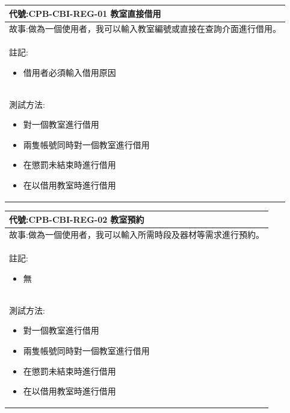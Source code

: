 \documentclass{article}
\begin{document}
\begin{table}[H]
    \begin{tabular}{| m{13cm} |}
		\hline
	代號:CPB-CBI-REG-01	教室直接借用	\\ \hline
	故事:做為一個使用者，我可以輸入教室編號或直接在查詢介面進行借用。		\\	\hline
	註記:
	\begin{itemize}
		\item 借用者必須輸入借用原因
	\end{itemize}		\\ \hline
	測試方法:	
	\begin{itemize}
		\item 對一個教室進行借用
		\item 兩隻帳號同時對一個教室進行借用
		\item 在懲罰未結束時進行借用
		\item 在以借用教室時進行借用
	\end{itemize}
	\\	\hline
    \end{tabular}
\end{table}

\begin{table}[H]
    \begin{tabular}{| m{13cm} |}
		\hline
	代號:CPB-CBI-REG-02	教室預約	\\ \hline
	故事:做為一個使用者，我可以輸入所需時段及器材等需求進行預約。		\\	\hline
	註記:
	\begin{itemize}
		\item 無
	\end{itemize}		\\ \hline
	測試方法:	
	\begin{itemize}
		\item 對一個教室進行借用
		\item 兩隻帳號同時對一個教室進行借用
		\item 在懲罰未結束時進行借用
		\item 在以借用教室時進行借用
	\end{itemize}
	\\	\hline
    \end{tabular}
\end{table}
\end{document}
